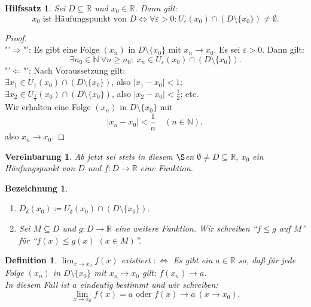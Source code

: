 \documentclass[12pt]{extreport} %
\newcommand{\N}{\mathbb{N}}
\newcommand{\R}{\mathbb{R}}
\theoremstyle{named}
\theoremstyle{itshape}
\newtheorem*{definition}{Definition}
\newtheorem{hilfssatz}[unnamedtheorem]{Hilfssatz}
\theoremstyle{normal}
\newtheorem*{bezeichnung}{Bezeichnung}
\newtheorem*{vereinbarung}{Vereinbarung}
\begin{document}
\begin{hilfssatz} \label{6.1:hsatz}
	Sei $D \subseteq \R$ und $x_{0} \in \R$. Dann gilt: 
	$$
	x_{0} \text{ ist Häufungspunkt von } D \iff \forall \varepsilon > 0: U_{\varepsilon}(x_{0}) \cap (D \setminus \{ x_{0} \}) \neq \emptyset.
	$$
\end{hilfssatz}

\begin{proof} ~\\
	"'$\Rightarrow$"': Es gibt eine Folge $(x_{n})$ in $D \setminus \{ x_{0} \}$ mit $x_{n} \rightarrow x_{0}$. Es sei $\varepsilon > 0$. Dann gilt:
	$$ \exists n_{0} \in \N ~ \forall n \geq n_{0}: ~ x_{n} \in U_{\varepsilon}(x_{0}) \cap (D \setminus \{ x_{0} \}). $$
	"'$\Leftarrow$"': Nach Voraussetzung gilt:\\
	$\exists x_{1} \in U_{1}(x_{0}) \cap (D \setminus \{ x_{0} \})$, also $|x_{1} - x_{0}| < 1$; \\
	$\exists x_{2} \in U_{\frac{1}{2}}(x_{0}) \cap (D \setminus \{ x_{0} \})$, also $|x_{2} - x_{0}| < \frac{1}{2}$; etc. \\
	Wir erhalten eine Folge $(x_{n})$ in $D \setminus \{ x_{0} \}$ mit 
	$$ |x_{n} - x_{0}| < \frac{1}{n} \quad (n \in \N), $$
	also $x_{n} \rightarrow x_{0}$.
\end{proof}


\begin{vereinbarung}
	Ab jetzt sei stets in diesem $\S$en
	$\emptyset \neq D \subseteq \R$, $x_{0}$ ein Häufungspunkt von $D$ und $f : D \rightarrow \R$ eine Funktion.
\end{vereinbarung}


\begin{bezeichnung} ~\
	\begin{enumerate}
		\item $D_{\delta}(x_{0}) \coloneqq U_{\delta}(x_{0}) \cap (D \setminus \{ x_{0} \})$.
		\item Sei $M \subseteq D$ und $g \colon D \rightarrow \R$ eine weitere Funktion. Wir schreiben ``$f \leq g$ auf $M$'' für
		``$f(x) \leq g(x)$ $(x \in M)$''.
	\end{enumerate}
\end{bezeichnung}


\begin{definition}
	$\lim_{x \rightarrow x_{0}} f(x)$ existiert $:\iff$ Es gibt ein $a \in \R$ so, da{\ss} für jede Folge $(x_{n})$ in $D \setminus \{ x_{0} \}$ mit $x_{n} \rightarrow x_{0}$ gilt: 
	$f(x_{n}) \rightarrow a$. \\
	In diesem Fall ist $a$ eindeutig bestimmt und wir schreiben:
		$$ \lim_{x \rightarrow x_{0}} f(x) = a \text{ oder } f(x) \rightarrow a ~(x \rightarrow x_{0}). $$
\end{definition}
\end{document}
